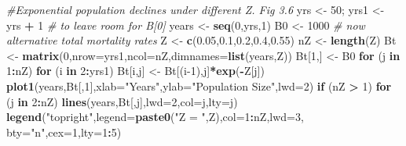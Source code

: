 \documentclass[
  lang=cn,
  11pt,
  scheme=chinese,
  chinesefont=nofont,
  citestyle=gb7714-2015,
  bibstyle=gb7714-2015]{elegantbook}
\newenvironment{Shaded}{\begin{snugshade}}{\end{snugshade}}
\newcommand{\AttributeTok}[1]{\textcolor[rgb]{0.13,0.29,0.53}{#1}}
\newcommand{\CommentTok}[1]{\textcolor[rgb]{0.56,0.35,0.01}{\textit{#1}}}
\newcommand{\ControlFlowTok}[1]{\textcolor[rgb]{0.13,0.29,0.53}{\textbf{#1}}}
\newcommand{\DecValTok}[1]{\textcolor[rgb]{0.00,0.00,0.81}{#1}}
\newcommand{\FloatTok}[1]{\textcolor[rgb]{0.00,0.00,0.81}{#1}}
\newcommand{\FunctionTok}[1]{\textcolor[rgb]{0.13,0.29,0.53}{\textbf{#1}}}
\newcommand{\NormalTok}[1]{#1}
\newcommand{\OtherTok}[1]{\textcolor[rgb]{0.56,0.35,0.01}{#1}}
\newcommand{\SpecialCharTok}[1]{\textcolor[rgb]{0.81,0.36,0.00}{\textbf{#1}}}
\newcommand{\StringTok}[1]{\textcolor[rgb]{0.31,0.60,0.02}{#1}}
\begin{document}
\begin{Shaded}
\begin{Highlighting}[]
\CommentTok{\#Exponential population declines under different Z. Fig 3.6  }
\NormalTok{yrs }\OtherTok{\textless{}{-}} \DecValTok{50}\NormalTok{;  yrs1 }\OtherTok{\textless{}{-}}\NormalTok{ yrs }\SpecialCharTok{+} \DecValTok{1} \CommentTok{\# to leave room for B[0]  }
\NormalTok{years }\OtherTok{\textless{}{-}} \FunctionTok{seq}\NormalTok{(}\DecValTok{0}\NormalTok{,yrs,}\DecValTok{1}\NormalTok{)  }
\NormalTok{B0 }\OtherTok{\textless{}{-}} \DecValTok{1000}        \CommentTok{\# now alternative total mortality rates  }
\NormalTok{Z }\OtherTok{\textless{}{-}} \FunctionTok{c}\NormalTok{(}\FloatTok{0.05}\NormalTok{,}\FloatTok{0.1}\NormalTok{,}\FloatTok{0.2}\NormalTok{,}\FloatTok{0.4}\NormalTok{,}\FloatTok{0.55}\NormalTok{)   }
\NormalTok{nZ }\OtherTok{\textless{}{-}} \FunctionTok{length}\NormalTok{(Z)  }
\NormalTok{Bt }\OtherTok{\textless{}{-}} \FunctionTok{matrix}\NormalTok{(}\DecValTok{0}\NormalTok{,}\AttributeTok{nrow=}\NormalTok{yrs1,}\AttributeTok{ncol=}\NormalTok{nZ,}\AttributeTok{dimnames=}\FunctionTok{list}\NormalTok{(years,Z))  }
\NormalTok{Bt[}\DecValTok{1}\NormalTok{,] }\OtherTok{\textless{}{-}}\NormalTok{ B0  }
\ControlFlowTok{for}\NormalTok{ (j }\ControlFlowTok{in} \DecValTok{1}\SpecialCharTok{:}\NormalTok{nZ) }\ControlFlowTok{for}\NormalTok{ (i }\ControlFlowTok{in} \DecValTok{2}\SpecialCharTok{:}\NormalTok{yrs1) Bt[i,j] }\OtherTok{\textless{}{-}}\NormalTok{ Bt[(i}\DecValTok{{-}1}\NormalTok{),j]}\SpecialCharTok{*}\FunctionTok{exp}\NormalTok{(}\SpecialCharTok{{-}}\NormalTok{Z[j])  }
\FunctionTok{plot1}\NormalTok{(years,Bt[,}\DecValTok{1}\NormalTok{],}\AttributeTok{xlab=}\StringTok{"Years"}\NormalTok{,}\AttributeTok{ylab=}\StringTok{"Population Size"}\NormalTok{,}\AttributeTok{lwd=}\DecValTok{2}\NormalTok{)  }
\ControlFlowTok{if}\NormalTok{ (nZ }\SpecialCharTok{\textgreater{}} \DecValTok{1}\NormalTok{) }\ControlFlowTok{for}\NormalTok{ (j }\ControlFlowTok{in} \DecValTok{2}\SpecialCharTok{:}\NormalTok{nZ) }\FunctionTok{lines}\NormalTok{(years,Bt[,j],}\AttributeTok{lwd=}\DecValTok{2}\NormalTok{,}\AttributeTok{col=}\NormalTok{j,}\AttributeTok{lty=}\NormalTok{j)  }
\FunctionTok{legend}\NormalTok{(}\StringTok{"topright"}\NormalTok{,}\AttributeTok{legend=}\FunctionTok{paste0}\NormalTok{(}\StringTok{"Z = "}\NormalTok{,Z),}\AttributeTok{col=}\DecValTok{1}\SpecialCharTok{:}\NormalTok{nZ,}\AttributeTok{lwd=}\DecValTok{3}\NormalTok{,  }
       \AttributeTok{bty=}\StringTok{"n"}\NormalTok{,}\AttributeTok{cex=}\DecValTok{1}\NormalTok{,}\AttributeTok{lty=}\DecValTok{1}\SpecialCharTok{:}\DecValTok{5}\NormalTok{)   }
\end{Highlighting}
\end{Shaded}
\end{document}
